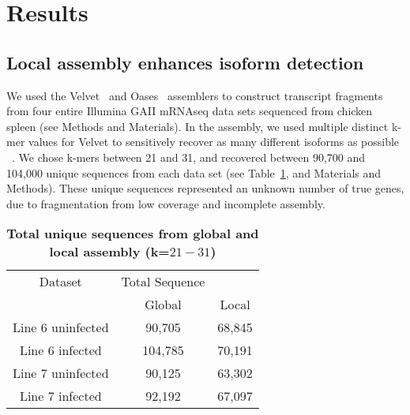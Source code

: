 \section{Results}

\subsection{Local assembly enhances isoform detection}

We used the Velvet~\cite{Zerbino:2008vu} and Oases~\cite{Schulz:2012je}
assemblers to construct transcript fragments from four entire Illumina
GAII mRNAseq data sets sequenced from chicken spleen (see Methods and
Materials).  In the assembly, we used multiple distinct k-mer values
for Velvet to sensitively recover as many different isoforms as possible
~\cite{Schulz:2012je}.  We chose k-mers between 21 and 31,
and recovered between 90,700 and 104,000 unique sequences from
each data set (see Table~\ref{total_sequences}, and Materials and
Methods).  These unique sequences represented an unknown number of
true genes, due to fragmentation from low coverage and incomplete
assembly.

\begin{table}
\caption{
\textbf{Total unique sequences from global and local assembly (k=$21-31$)}
}
\begin{center}
\begin{tabular}{ccc}
\hline
Dataset & Total Sequence & \\
        & Global & Local \\
\hline
Line 6 uninfected & 90,705 & 68,845\\
Line 6 infected & 104,785 & 70,191 \\
Line 7 uninfected & 90,125 & 63,302\\
Line 7 infected &  92,192 & 67,097 \\
\hline
\end{tabular}
\label{total_sequences}
\end{center}
\end{table}

